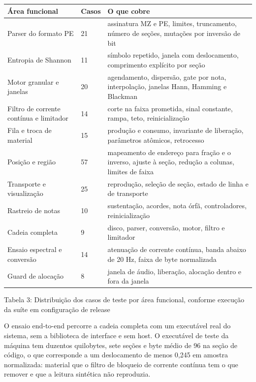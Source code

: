 \documentclass[12pt,a4paper]{article}
\begin{document}
\begin{center}
\footnotesize
\setlength{\tabcolsep}{4pt}
\begin{tabular}{p{}|p{}|p{}}
\hline
\textbf{Área funcional} & \textbf{Casos} & \textbf{O que cobre} \\
\hline
Parser do formato PE & 21 & assinatura MZ e PE, limites, truncamento, número de seções, mutações por inversão de bit \\
Entropia de Shannon & 11 & símbolo repetido, janela com deslocamento, comprimento explícito por seção \\
Motor granular e janelas & 20 & agendamento, dispersão, gate por nota, interpolação, janelas Hann, Hamming e Blackman \\
Filtro de corrente contínua e limitador & 14 & corte na faixa prometida, sinal constante, rampa, teto, reinicialização \\
Fila e troca de material & 15 & produção e consumo, invariante de liberação, parâmetros atômicos, retrocesso \\
Posição e região & 57 & mapeamento de endereço para fração e o inverso, ajuste à seção, redução a colunas, limites de faixa \\
Transporte e visualização & 25 & reprodução, seleção de seção, estado de linha e de transporte \\
Rastreio de notas & 10 & sustentação, acordes, nota órfã, controladores, reinicialização \\
Cadeia completa & 9 & disco, parser, conversão, motor, filtro e limitador \\
Ensaio espectral e conversão & 14 & atenuação de corrente contínua, banda abaixo de 20 Hz, faixa de byte normalizada \\
Guard de alocação & 8 & janela de áudio, liberação, alocação dentro e fora da janela \\
\hline
\end{tabular}
\end{center}
\noindent Tabela 3: Distribuição dos casos de teste por área funcional, conforme execução da suíte em configuração de release\par
\label{tab:3}
\vspace{2pt}{\footnotesize\noindent Elaborado pelos autores (2026), a partir da execução da suíte de testes em configuração de release.\par}

O ensaio end-to-end percorre a cadeia completa com um executável real do sistema, sem a biblioteca de interface e sem host. O executável de teste da máquina tem duzentos quilobytes, sete seções e byte médio de 96 na seção de código, o que corresponde a um deslocamento de menos 0,245 em amostra normalizada: material que o filtro de bloqueio de corrente contínua tem o que remover e que a leitura sintética não reproduzia.
\end{document}

